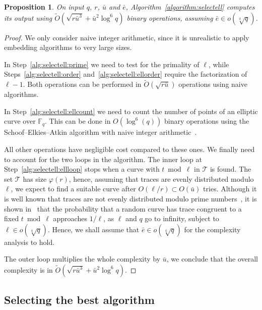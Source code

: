 \documentclass[12pt]{article}
\theoremstyle{plain}
\newtheorem{proposition}[theorem]{Proposition}
\theoremstyle{definition}
\newcommand{\tildO}{\tilde{O}}
\def\F{\ensuremath{\mathbb{F}}}
\def\euler{\ensuremath{\varphi}}
\newcounter{algorithm}
\begin{document}
\begin{proposition}
  On input $q$, $r$, $\bar{u}$ and $\bar{e}$,
  Algorithm~\ref{algorithm:selectell} computes its output using
  $\tildO\left(\sqrt{r\bar{u}^3} + \bar{u}^2\log^6{q}\right)$ binary
  operations, assuming $\bar{e}\in o(\sqrt[4]{q})$.
\end{proposition}
\begin{proof}
  We only consider naive integer arithmetic, since it is unrealistic
  to apply embedding algorithms to very large sizes.

  In Step~\ref{alg:selectell:prime} we need to test for the primality
  of $\ell$, while Steps~\ref{alg:selectell:order}
  and~\ref{alg:selectell:ellorder} require the factorization of
  $\ell-1$. Both operations can be performed in
  $\tildO(\sqrt{r\bar{u}})$ operations using naive algorithms.

  In Step~\ref{alg:selectell:ellcount} we need to count the number
  of points of an elliptic curve over $\F_q$. This can be done in
  $O\left(\log^6(q)\right)$ binary operations using the
  Schoof--Elkies--Atkin algorithm with naive integer
  arithmetic~\cite{schoof95,lercier+sirvent08}.

  All other operations have negligible cost compared to these ones. We
  finally need to account for the two loops in the algorithm. The
  inner loop at Step~\ref{alg:selectell:ellloop} stops when a curve
  with $t\bmod\ell$ in $\mathcal{T}$ is found. The set $\mathcal{T}$
  has size $\euler(r)$, hence, assuming that traces are evenly
  distributed modulo $\ell$, we expect to find a suitable curve after
  $O(\ell/r)\subset O(\bar{u})$ tries. Although it is well known that
  traces are not evenly distributed modulo prime
  numbers~\cite{lenstra87}, it is shown
  in~\cite[Th.~1]{castryck+hubrechts13} that the probability that a
  random curve has trace congruent to a fixed $t\bmod\ell$ approaches
  $1/\ell$, as $\ell$ and $q$ go to infinity, subject to $\ell\in
  o(\sqrt[4]{q})$. Hence, we shall assume that $\bar{e}\in
  o(\sqrt[4]{q})$ for the complexity analysis to hold.

  The outer loop multiplies the whole complexity by $\bar{u}$, we
  conclude that the overall complexity is in
  $\tildO\left(\sqrt{r\bar{u}^3} + \bar{u}^2\log^6{q}\right)$.
\end{proof}


\subsection{Selecting the best algorithm}
\end{document}
